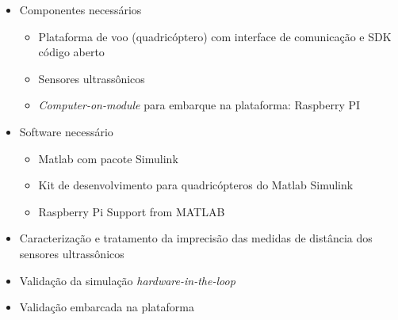 \documentclass{beamer}
\begin{document}
\begin{frame}[allowframebreaks]
\begin{itemize}
	
	\framebreak
	
		\item Componentes necessários
		\begin{itemize}	
			
			\item Plataforma de voo (quadricóptero) com interface de comunicação e SDK código aberto
			
			\item Sensores ultrassônicos
			
			\item \textit{Computer-on-module} para embarque na plataforma: Raspberry PI
				
		\end{itemize}
		
		\item Software necessário
		\begin{itemize}	
			
			\item Matlab com pacote Simulink
			
			\item Kit de desenvolvimento para quadricópteros do Matlab Simulink
			
			\item Raspberry Pi Support from MATLAB
			
		\end{itemize}
	
%		
%		
		
		\framebreak	
		
		\item Caracterização e tratamento da imprecisão das medidas de distância dos sensores ultrassônicos
		
		\item Validação da simulação \textit{hardware-in-the-loop}
		
		\item Validação embarcada na plataforma
		
			
			
	\end{itemize}
	
		 
	
\end{frame}
\end{document}
